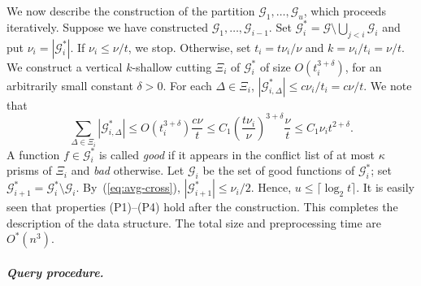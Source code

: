 \documentclass[11pt]{article}
\newif\ifsocgproc
\def\G{\mathcal{G}}
\def\ceil#1{\lceil #1\rceil}
\theoremstyle{definition}
\begin{document}
%
We now describe the construction of the partition $\G_1, \ldots, \G_u$, which proceeds
iteratively. Suppose we have constructed $\G_1, \ldots, \G_{i-1}$. Set 
$\G_i^* = \G \setminus \bigcup_{j < i} \G_i$ and put $\nu_i = |\G_i^*|$. 
If $\nu_i \le \nu/t$, we stop. Otherwise, set $t_i = t\nu_i/\nu$ and $k=\nu_i/t_i=\nu/t$.
%
We construct a vertical $k$-shallow cutting $\Xi_i$ of $\G_i^*$ of size $O(t_i^{3+\delta})$,
for an arbitrarily small constant $\delta>0$. 
For each $\Delta\in \Xi_i$, $|\G_{i,\Delta}^*| \le c\nu_i/t_i = c\nu/t$. We note that
\begin{equation}
\label{eq:avg-cross}
\sum_{\Delta\in\Xi_i} |\G_{i,\Delta}^*| \le O(t_i^{3+\delta}) \frac{c\nu}{t} 
\le C_1 \left ( \frac{t\nu_i}{\nu}\right)^{3+\delta} \frac{\nu}{t} 
\le C_1 \nu_i t^{2+\delta} .
\end{equation}
A function $f \in \G_i^*$ is called \emph{good} if it appears in the conflict list of at 
most $\kappa$ prisms of $\Xi_i$ and \emph{bad} otherwise. 
Let $\G_i$ be the set of good functions of $\G_i^*$; set $\G_{i+1}^* = \G_i^*\setminus \G_i$.
By~(\ref{eq:avg-cross}), $|\G_{i+1}^*| \le \nu_i/2$. Hence, $u \le \ceil{\log_2 t}$. 
It is easily seen that properties (P1)--(P4) hold after the construction.
This completes the description of the data structure. The total size and preprocessing time are $O^*(n^3)$.
%
%
\ifsocgproc 
\subparagraph*{Query procedure.}
\else
\end{document}
